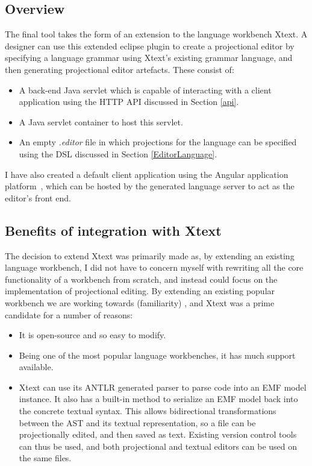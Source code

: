 \documentclass{article}
\begin{document}
\subsection{Overview}

The final tool takes the form of an extension to the language workbench Xtext. A designer can use this extended eclipse plugin to create a projectional editor by specifying a language grammar using Xtext's existing grammar language, and then generating projectional editor artefacts. These consist of:
\begin{itemize}
\item A back-end Java servlet which is capable of interacting with a client application using the HTTP API discussed in Section \ref{api}.
\item A Java servlet container to host this servlet.
\item An empty \emph{.editor} file in which projections for the language can be specified using the DSL discussed in Section \ref{EditorLanguage}. 
\end{itemize}
%
I have also created a default client application using the Angular application platform~\cite{angular}, which can be hosted by the generated language server to act as the editor's front end. 

\subsection{Benefits of integration with Xtext}\label{integrationWithXtext}
The decision to extend Xtext was primarily made as, by extending an existing language workbench, I did not have to concern myself with rewriting all the core functionality of a workbench from scratch, and instead could focus on the implementation of projectional editing. By extending an existing popular workbench we are working towards \RFamiliarity (familiarity) , and Xtext was a prime candidate for a number of reasons:
\begin{itemize}
\item It is open-source and so easy to modify.
\item Being one of the most popular language workbenches, it has much support available.
\item Xtext can use its ANTLR generated parser to parse code into an EMF model instance. It also has a built-in method to serialize an EMF model back into the concrete textual syntax. This allows bidirectional transformations between the AST and its textual representation, so a file can be projectionally edited, and then saved as text. Existing version control tools can thus be used, and both projectional and textual editors can be used on the same files.
\end{itemize}
\end{document}
